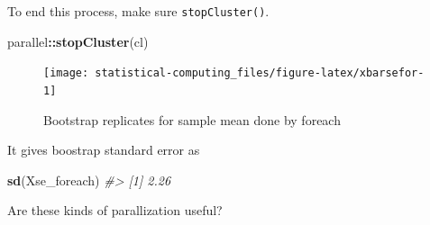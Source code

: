 \documentclass[]{book}
\newenvironment{Shaded}{\begin{snugshade}}{\end{snugshade}}
\newcommand{\CommentTok}[1]{\textcolor[rgb]{0.56,0.35,0.01}{\textit{#1}}}
\newcommand{\DataTypeTok}[1]{\textcolor[rgb]{0.13,0.29,0.53}{#1}}
\newcommand{\DecValTok}[1]{\textcolor[rgb]{0.00,0.00,0.81}{#1}}
\newcommand{\KeywordTok}[1]{\textcolor[rgb]{0.13,0.29,0.53}{\textbf{#1}}}
\newcommand{\NormalTok}[1]{#1}
\newcommand{\OperatorTok}[1]{\textcolor[rgb]{0.81,0.36,0.00}{\textbf{#1}}}
\newcommand{\StringTok}[1]{\textcolor[rgb]{0.31,0.60,0.02}{#1}}
\theoremstyle{definition}
\theoremstyle{definition}
\theoremstyle{definition}
\theoremstyle{remark}
\begin{document}
To end this process, make sure \texttt{stopCluster()}.

\begin{Shaded}
\begin{Highlighting}[]
\NormalTok{parallel}\OperatorTok{::}\KeywordTok{stopCluster}\NormalTok{(cl)}
\end{Highlighting}
\end{Shaded}

\begin{Shaded}
\end{Shaded}

\begin{figure}[H]

{\centering \texttt{[image: statistical-computing\_files/figure-latex/xbarsefor-1]} 

}

\caption{Bootstrap replicates for sample mean done by foreach}\label{fig:xbarsefor}
\end{figure}

It gives boostrap standard error as

\begin{Shaded}
\begin{Highlighting}[]
\KeywordTok{sd}\NormalTok{(Xse_foreach)}
\CommentTok{#> [1] 2.26}
\end{Highlighting}
\end{Shaded}

Are these kinds of parallization useful?
\end{document}
